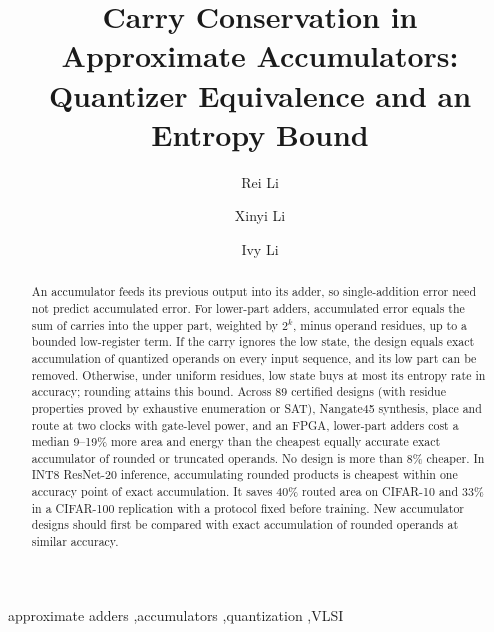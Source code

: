 \documentclass[preprint,12pt,numbers]{elsarticle}
\theoremstyle{definition}
\begin{document}
\begin{frontmatter}
\title{Carry Conservation in Approximate Accumulators: Quantizer Equivalence and an Entropy Bound}
\author[nyu]{Rei Li}
\author[nyu]{Xinyi Li}
\author[rochester]{Ivy Li}

\begin{abstract}
An accumulator feeds its previous output into its adder, so single-addition
error need not predict accumulated error.
For lower-part adders, accumulated error equals the sum of carries into
the upper part, weighted by $2^k$, minus operand residues, up to a
bounded low-register term. If the carry ignores the low state, the
design equals exact accumulation of quantized operands on every input
sequence, and its low part can be removed. Otherwise, under uniform
residues, low state buys at most its entropy rate in accuracy; rounding
attains this bound. Across 89 certified designs (with residue properties
proved by exhaustive enumeration or SAT), Nangate45 synthesis,
place and route at two clocks with gate-level power, and an FPGA,
lower-part adders cost a median 9--19\% more area and energy than the
cheapest equally accurate exact accumulator of rounded or truncated
operands. No design is more than 8\% cheaper. In INT8 ResNet-20
inference, accumulating rounded products is cheapest within one
accuracy point of exact accumulation. It saves 40\% routed area on
CIFAR-10 and 33\% in a CIFAR-100 replication with a protocol fixed
before training. New accumulator designs should first be compared
with exact accumulation of rounded operands at similar accuracy.
\end{abstract}

\begin{keyword}
approximate adders \sep accumulators \sep quantization \sep VLSI
\end{keyword}
\end{frontmatter}
\end{document}
